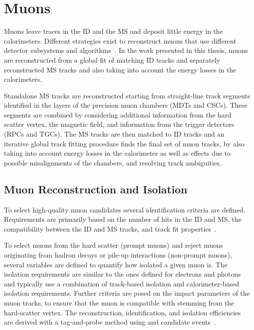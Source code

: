 
\section{Muons}
\label{sec:muon-reconstruction}
Muons leave traces in the ID and the MS and deposit little energy in the calorimeters.
Different strategies exist to reconstruct muons that use different detector subsystems and algorithms~\cite{MUON-2018-03}.
In the work presented in this thesis, muons are reconstructed from a global fit of matching ID tracks and separately reconstructed MS tracks and also taking into account the energy losses in the calorimeters.

Standalone MS tracks are reconstructed starting from straight-line track segments identified in the layers of the precision muon chambers (MDTs and CSCs).
These segments are combined by considering additional information from the hard scatter vertex, the magnetic field, and information from the trigger detectors (RPCs and TGCs). The MS tracks are then matched to ID tracks and an iterative global track fitting procedure finds the final set of muon tracks, by also taking into account energy losses in the calorimeter as well as effects due to possible misalignments of the chambers, and resolving track ambiguities.

\subsection{Muon Reconstruction and Isolation}
To select high-quality muon candidates several identification criteria are defined.
Requirements are primarily based on the number of hits in the ID and MS, the compatibility between the ID and MS tracks, and track fit properties~\cite{MUON-2018-03}.

To select muons from the hard scatter (prompt muons) and reject muons originating from hadron decays or pile-up interactions (non-prompt muons), several variables are defined to quantify how isolated a given muon is.
The isolation requirements are similar to the ones defined for electrons and photons and typically use a combination of track-based isolation and calorimeter-based isolation requirements.
Further criteria are posed on the impact parameters of the muon tracks, to ensure that the muon is compatible with stemming from the hard-scatter vertex.
The reconstruction, identification, and isolation efficiencies are derived with a tag-and-probe method using \Jpsimumu and \Zmumu candidate events~\cite{MUON-2018-03}.

